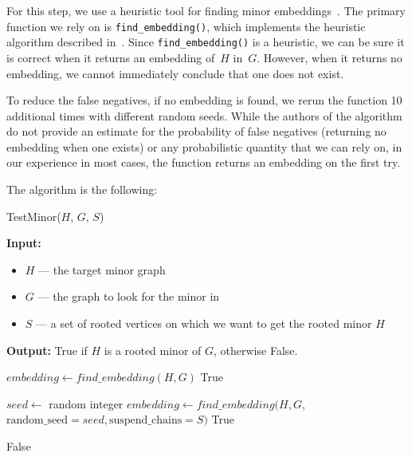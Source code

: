 For this step, we use a heuristic tool for finding minor embeddings~\cite{dwavesystems2023minorminer}. The primary function we rely on is \texttt{find\_embedding()}, which implements the heuristic algorithm described in~\cite{cai2014practicalheuristicfindinggraph}.
Since \texttt{find\_embedding()} is a heuristic, we can be sure it is correct when it returns an embedding of~$H$ in~$G$. However, when it returns no embedding, we cannot immediately conclude that one does not exist.

To reduce the false negatives, if no embedding is found, we rerun the function 10 additional times with different random seeds. While the authors of the algorithm do not provide an estimate for the probability of false negatives (returning no embedding when one exists) or any 
probabilistic quantity that we can rely on, in our experience in most cases,
the function returns an embedding on the first try.

The algorithm is the following:

\begin{algorithm}[H]
    \caption{TestMinor($H$, $G$, $S$)}
    \begin{algorithmic}[1]
        \Statex \textbf{Input:} 
        \begin{itemize}
            \item \( H \) — the target minor graph
            \item \( G \) — the graph to look for the minor in
            \item \( S \) — a set of rooted vertices on which we want to get the rooted minor $H$ 
        \end{itemize}
        \Statex \textbf{Output:} True if $H$ is a rooted minor of $G$, otherwise False.

        \State $embedding \gets {find\_embedding}(H, G)$
            \State \Return True
        \EndIf

            \State $seed \gets$ random integer
            \State $embedding \gets find\_embedding(H, G,$
            \Statex \hspace{\algorithmicindent}$\text{random\_seed} = seed, \text{suspend\_chains} = S)$
                \State \Return True
            \EndIf
        \EndFor

        \State \Return False
    \end{algorithmic}
\end{algorithm}

